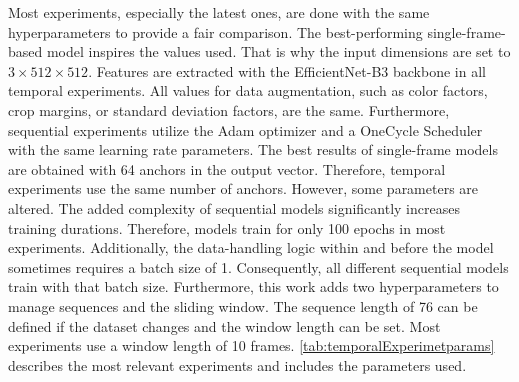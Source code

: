 Most experiments, especially the latest ones, are done with the same hyperparameters to provide a fair comparison.
The best-performing single-frame-based model inspires the values used.
That is why the input dimensions are set to $3 \times 512 \times 512$.
Features are extracted with the EfficientNet-B3 backbone in all temporal experiments.
All values for data augmentation, such as color factors, crop margins, or standard deviation factors, are the same.
Furthermore, sequential experiments utilize the Adam optimizer \cite{pytorchAdamOptimizer} and a OneCycle Scheduler \cite{pytorch_oneCycleLR_docu} with the same learning rate parameters.
The best results of single-frame models are obtained with 64 anchors in the output vector.
Therefore, temporal experiments use the same number of anchors.
However, some parameters are altered.
The added complexity of sequential models significantly increases training durations.
Therefore, models train for only 100 epochs in most experiments.
Additionally, the data-handling logic within and before the model sometimes requires a batch size of 1.
Consequently, all different sequential models train with that batch size.
Furthermore, this work adds two hyperparameters to manage sequences and the sliding window.
The sequence length of 76 can be defined if the dataset changes and the window length can be set.
Most experiments use a window length of 10 frames.
\autoref{tab:temporalExperimetparams} describes the most relevant experiments and includes the parameters used.

